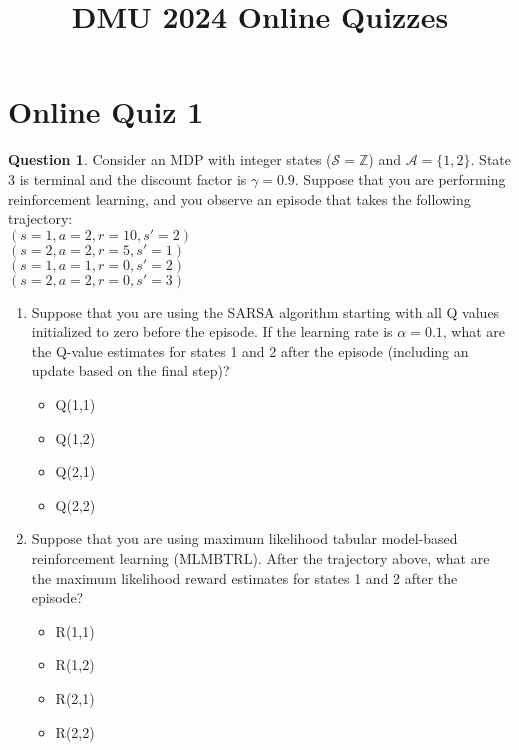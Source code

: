 \documentclass{article}
\title{DMU 2024 Online Quizzes}
\theoremstyle{definition}
\newtheorem{question}{Question}
\begin{document}
\maketitle

\section*{Online Quiz 1}

\begin{question}
Consider an MDP with integer states ($\mathcal{S} = \mathbb{Z}$) and $\mathcal{A} = \{1, 2\}$. State 3 is terminal and the discount factor is $\gamma=0.9$. Suppose that you are performing reinforcement learning, and you observe an episode that takes the following trajectory:\\
    $(s=1, a=2, r=10, s'=2)$\\
    $(s=2, a=2, r=5, s'=1)$\\
    $(s=1, a=1, r=0, s'=2)$\\
    $(s=2, a=2, r=0, s'=3)$\\

\begin{enumerate}
    \item Suppose that you are using the SARSA algorithm starting with all Q values initialized to zero before the episode. If the learning rate is $\alpha=0.1$, what are the Q-value estimates for states 1 and 2 after the episode (including an update based on the final step)?
    \begin{itemize}
        \item Q(1,1)
        \item Q(1,2)
        \item Q(2,1)
        \item Q(2,2)
    \end{itemize}
    \item Suppose that you are using maximum likelihood tabular model-based reinforcement learning (MLMBTRL). After the trajectory above, what are the maximum likelihood reward estimates for states 1 and 2 after the episode?
    \begin{itemize}
        \item R(1,1)
        \item R(1,2)
        \item R(2,1)
        \item R(2,2)
    \end{itemize}
\end{enumerate}
\end{question}
\end{document}
